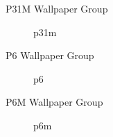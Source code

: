 \begin{frame}{P31M Wallpaper Group}
    \begin{figure}
        \centering
        
        \caption{p31m}
        \label{fig:p31m}
    \end{figure}
\end{frame}

\begin{frame}{P6 Wallpaper Group}
    \begin{figure}
        \centering
        
        \caption{p6}
        \label{fig:p3}
    \end{figure}
\end{frame}

\begin{frame}{P6M Wallpaper Group}
    \begin{figure}
        \centering
        
        \caption{p6m}
        \label{fig:p3m}
    \end{figure}
\end{frame}
